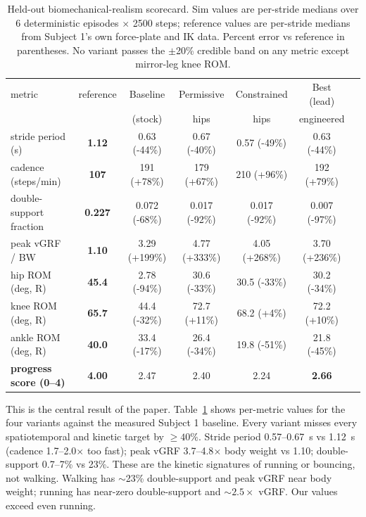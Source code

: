 \documentclass{article}
\begin{document}
\begin{table}[!h]
  \caption{Held-out biomechanical-realism scorecard. Sim values are
  per-stride medians over 6 deterministic episodes $\times$ 2500
  steps; reference values are per-stride medians from Subject 1's
  own force-plate and IK data. Percent error vs reference in
  parentheses. No variant passes the $\pm$20\% credible band on any
  metric except mirror-leg knee ROM.}
  \label{tab:scorecard}
  \centering
  \small
  \begin{tabular}{lcccccc}
    \toprule
    metric & reference & Baseline & Permissive & Constrained & Best (lead) \\
           &           & (stock)  & hips       & hips        & engineered  \\
    \midrule
    stride period (s)        & \textbf{1.12}  & 0.63 (-44\%)  & 0.67 (-40\%)  & 0.57 (-49\%)  & 0.63 (-44\%)  \\
    cadence (steps/min)      & \textbf{107}   & 191 (+78\%)   & 179 (+67\%)   & 210 (+96\%)   & 192 (+79\%)   \\
    double-support fraction  & \textbf{0.227} & 0.072 (-68\%) & 0.017 (-92\%) & 0.017 (-92\%) & 0.007 (-97\%) \\
    peak vGRF / BW           & \textbf{1.10}  & 3.29 (+199\%) & 4.77 (+333\%) & 4.05 (+268\%) & 3.70 (+236\%) \\
    hip ROM (deg, R)         & \textbf{45.4}  & 2.78 (-94\%)  & 30.6 (-33\%)  & 30.5 (-33\%)  & 30.2 (-34\%)  \\
    knee ROM (deg, R)        & \textbf{65.7}  & 44.4 (-32\%)  & 72.7 (+11\%)  & 68.2 (+4\%)   & 72.2 (+10\%)  \\
    ankle ROM (deg, R)       & \textbf{40.0}  & 33.4 (-17\%)  & 26.4 (-34\%)  & 19.8 (-51\%)  & 21.8 (-45\%)  \\
    \midrule
    \textbf{progress score (0--4)} & \textbf{4.00} & 2.47 & 2.40 & 2.24 & \textbf{2.66} \\
    \bottomrule
  \end{tabular}
\end{table}

This is the central result of the paper. Table~\ref{tab:scorecard}
shows per-metric values for the four variants against the measured
Subject 1 baseline. Every variant misses every spatiotemporal and
kinetic target by $\geq 40\%$. Stride period 0.57--0.67~s vs
1.12~s (cadence 1.7--2.0$\times$ too fast); peak vGRF
3.7--4.8$\times$ body weight vs 1.10; double-support 0.7--7\% vs
23\%. These are the kinetic signatures of running or bouncing,
not walking. Walking has $\sim$23\% double-support and peak vGRF
near body weight; running has near-zero double-support and
$\sim 2.5\times$ vGRF. Our values exceed even running.
\end{document}
